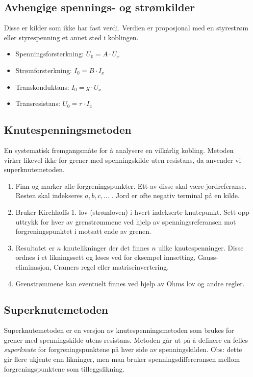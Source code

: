 \documentclass{article}
\begin{document}
\subsection{Avhengige spennings- og strømkilder}
Disse er kilder som ikke har fast verdi. Verdien er proposjonal med en styrestrøm eller styrespenning et annet sted i koblingen.
\begin{itemize}
    \item Spenningsforsterkning: $U_0 = A \cdot U_x$
    \item Strømforsterkning: $I_0 = B \cdot I_x$
    \item Transkonduktans: $I_0 = g \cdot U_x$
    \item Transresistans: $U_0 = r \cdot I_x$
\end{itemize}

\subsection{Knutespenningsmetoden}
En systematisk fremgangsmåte for å analysere en vilkårlig kobling. Metoden virker likevel ikke for grener med spenningskilde uten resistans, da anvender vi superknutemetoden.
\begin{enumerate}
    \item Finn og marker alle forgreningspunkter. Ett av disse skal være jordreferanse. Resten skal indekseres $a, b, c, ...$ . Jord er ofte negativ terminal på en kilde.
    \item Bruker Kirchhoffs 1. lov (strømloven) i hvert indekserte knutepunkt. Sett opp uttrykk for hver av grenstrømmene ved hjelp av spenningsreferansen mot forgreningspunktet i motsatt ende av grenen.
    \item Resultatet er $n$ knutelikninger der det finnes $n$ ulike knutespenninger. Disse ordnes i et likningssett og løses ved for eksempel innsetting, Gauss-eliminasjon, Cramers regel eller matriseinvertering.
    \item Grenstrømmene kan eventuelt finnes ved hjelp av Ohms lov og andre regler.
\end{enumerate}

\subsection{Superknutemetoden}
Superknutemetoden er en versjon av knutespenningsmetoden som brukes for grener med spenningskilde utens resistans. Metoden går ut på å definere en felles \textit{superknute} for forgreningspunktene på hver side av spenningskilden. Obs: dette gir flere ukjente enn likninger, men man bruker spenningsdiffereransen mellom forgreningspunktene som tilleggslikning. 
\end{document}
